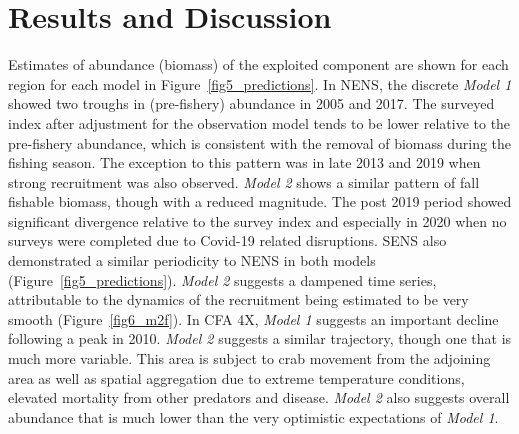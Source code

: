 \documentclass[
	letterpaper, %
	10pt, %
]{article}
\begin{document}
 


\section{Results and Discussion}

Estimates of abundance (biomass) of the exploited component are shown for each region for each model
in Figure~\ref{fig5_predictions}. In NENS, the discrete \emph{Model 1} showed two troughs in (pre-fishery) abundance in 2005 and 2017. The surveyed index after adjustment for
the observation model tends to be lower relative to the pre-fishery
abundance, which is consistent with the removal of biomass during
the fishing season. The exception to this pattern was in late
2013 and 2019 when strong recruitment was also observed. \emph{Model 2} shows
a similar pattern of fall fishable biomass, though with a reduced
magnitude. The post 2019 period showed significant divergence relative
to the survey index and especially in 2020 when no surveys were completed
due to Covid-19 related disruptions. SENS also demonstrated a similar
periodicity to NENS in both models (Figure~\ref{fig5_predictions}). \emph{Model 2} suggests a
dampened time series, attributable to the dynamics of the recruitment
being estimated to be very smooth (Figure~\ref{fig6_m2f}). In CFA 4X, \emph{Model 1}
suggests an important decline following a peak in 2010. \emph{Model 2} suggests
a similar trajectory, though one that is much more variable. This
area is subject to crab movement from the adjoining area as well as
spatial aggregation due to extreme temperature conditions, elevated
mortality from other predators and disease. \emph{Model 2} also suggests
overall abundance that is much lower than the very optimistic expectations
of \emph{Model 1}.
\end{document}

